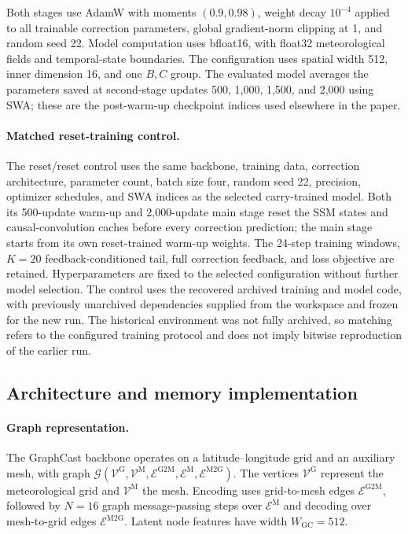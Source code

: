 \documentclass{article}
\newcommand{\vfourchange}[1]{{\color{blue}#1}}
\begin{document}
\vfourchange{Both stages use AdamW with moments $(0.9,0.98)$, weight decay $10^{-4}$ applied to all trainable correction parameters, global gradient-norm clipping at 1, and random seed 22. Model computation uses bfloat16, with float32 meteorological fields and temporal-state boundaries.} The configuration uses spatial width 512, inner dimension 16, and one $B,C$ group. \vfourchange{The evaluated model averages the parameters saved at second-stage updates 500, 1,000, 1,500, and 2,000 using SWA; these are the post-warm-up checkpoint indices used elsewhere in the paper.}

\paragraph{\vfourchange{Matched reset-training control.}}

\vfourchange{The reset/reset control uses the same backbone, training data, correction architecture, parameter count, batch size four, random seed 22, precision, optimizer schedules, and SWA indices as the selected carry-trained model. Both its 500-update warm-up and 2,000-update main stage reset the SSM states and causal-convolution caches before every correction prediction; the main stage starts from its own reset-trained warm-up weights. The 24-step training windows, $K=20$ feedback-conditioned tail, full correction feedback, and loss objective are retained. Hyperparameters are fixed to the selected configuration without further model selection. The control uses the recovered archived training and model code, with previously unarchived dependencies supplied from the workspace and frozen for the new run. The historical environment was not fully archived, so matching refers to the configured training protocol and does not imply bitwise reproduction of the earlier run.}

\subsection{Architecture and memory implementation}
\label{app:architecture_details}
\paragraph{Graph representation.}
The GraphCast backbone operates on a latitude--longitude grid and an auxiliary mesh, with graph $\mathcal{G}(\mathcal{V}^{\textrm{G}},\mathcal{V}^{\textrm{M}},\mathcal{E}^{\textrm{G2M}},\mathcal{E}^{\textrm{M}},\mathcal{E}^{\textrm{M2G}})$. The vertices $\mathcal{V}^{\textrm{G}}$ represent the meteorological grid and $\mathcal{V}^{\textrm{M}}$ the mesh. Encoding uses grid-to-mesh edges $\mathcal{E}^{\textrm{G2M}}$, followed by $N=16$ graph message-passing steps over $\mathcal{E}^{\textrm{M}}$ and decoding over mesh-to-grid edges $\mathcal{E}^{\textrm{M2G}}$. Latent node features have width $W_{\textrm{GC}}=512$.
\end{document}
